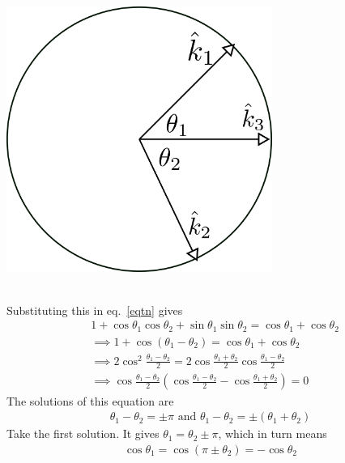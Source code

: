 \documentclass[14pt]{extarticle}
\begin{document}
\begin{minipage}{0.35\textwidth}
	\centering
	\includegraphics[width=0.65\textwidth]{./figures/term2.png}
\end{minipage}\\
Substituting this in eq.~\ref{eqtn} gives
\begin{equation}\begin{aligned}
 &1 + \cos\theta_1\cos\theta_2 + \sin\theta_1\sin\theta_2= \cos\theta_1 + \cos\theta_2\\
 &\implies  1 + \cos\left(\theta_1 - \theta_2\right) = \cos\theta_1 + \cos\theta_2\\
 &\implies  2\cos^2\frac{\theta_1 - \theta_2}{2} = 2\cos\frac{\theta_1 + \theta_2}{2}\cos\frac{\theta_1 - \theta_2}{2}\\
 &\implies  \cos\frac{\theta_1 - \theta_2}{2}\left(\cos\frac{\theta_1 - \theta_2}{2} - \cos\frac{\theta_1 + \theta_2}{2}\right) =0
\end{aligned}\end{equation}
The solutions of this equation are
\begin{equation}\begin{aligned}
	\theta_1 - \theta_2 = \pm \pi \text{ and } \theta_1 - \theta_2 = \pm\left(\theta_1 + \theta_2\right)
\end{aligned}\end{equation}
Take the first solution. It gives \(\theta_1 = \theta_2 \pm \pi\), which in turn means
\begin{equation}\begin{aligned}
\label{cos}
\cos \theta_1 = \cos \left(\pi \pm \theta_2\right) = -\cos \theta_2
\end{aligned}\end{equation}
\end{document}
